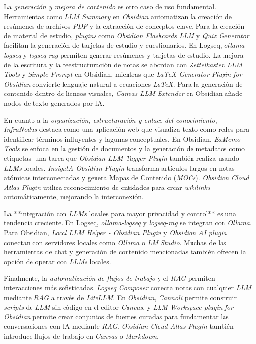 La \textit{generación y mejora de contenido} es otro caso de uso fundamental. Herramientas como \textit{LLM Summary} en \textit{Obsidian} automatizan la creación de resúmenes de archivos \textit{PDF} y la extracción de conceptos clave. Para la creación de material de estudio, \textit{plugins} como \textit{Obsidian Flashcards LLM} y \textit{Quiz Generator} facilitan la generación de tarjetas de estudio y cuestionarios. En Logseq, \textit{ollama-logseq} y \textit{logseq-rag} permiten generar resúmenes y tarjetas de estudio. La mejora de la escritura y la reestructuración de notas se abordan con \textit{Zettelkasten LLM Tools} y \textit{Simple Prompt} en Obsidian, mientras que \textit{LaTeX Generator Plugin for Obsidian} convierte lenguaje natural a ecuaciones \textit{LaTeX}. Para la generación de contenido dentro de lienzos visuales, \textit{Canvas LLM Extender} en Obsidian añade nodos de texto generados por IA.

En cuanto a la \textit{organización, estructuración y enlace del conocimiento}, \textit{InfraNodus} destaca como una aplicación web que visualiza texto como redes para identificar términos influyentes y lagunas conceptuales. En Obsidian, \textit{ExMemo Tools} se enfoca en la gestión de documentos y la generación de metadatos como etiquetas, una tarea que \textit{Obsidian LLM Tagger Plugin} también realiza usando \textit{LLMs} locales. \textit{InsightA Obsidian Plugin} transforma artículos largos en notas atómicas interconectadas y genera Mapas de Contenido (\textit{MOCs}). \textit{Obsidian Cloud Atlas Plugin} utiliza reconocimiento de entidades para crear \textit{wikilinks} automáticamente, mejorando la interconexión.

La **integración con \textit{LLMs} locales para mayor privacidad y control** es una tendencia creciente. En Logseq, \textit{ollama-logseq} y \textit{logseq-rag} se integran con \textit{Ollama}. Para Obsidian, \textit{Local LLM Helper - Obsidian Plugin} y \textit{Obsidian AI plugin} conectan con servidores locales como \textit{Ollama} o \textit{LM Studio}. Muchas de las herramientas de chat y generación de contenido mencionadas también ofrecen la opción de operar con \textit{LLMs} locales.

Finalmente, la \textit{automatización de flujos de trabajo} y el \textit{RAG} permiten interacciones más sofisticadas. \textit{Logseq Composer} conecta notas con cualquier \textit{LLM} mediante \textit{RAG} a través de \textit{LiteLLM}. En \textit{Obsidian}, \textit{Cannoli} permite construir \textit{scripts} de \textit{LLM} sin código en el editor \textit{Canvas}, y \textit{LLM Workspace plugin for Obsidian} permite crear conjuntos de fuentes curadas para fundamentar las conversaciones con IA mediante \textit{RAG}. \textit{Obsidian Cloud Atlas Plugin} también introduce flujos de trabajo en \textit{Canvas} o \textit{Markdown}.

